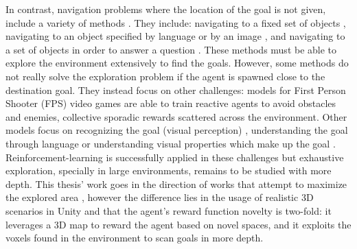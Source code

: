 In contrast, navigation problems where the location of the goal is not given, include a variety of methods \cite{chaplot2020semantic}. They include: navigating to a
fixed set of objects \cite{chaplot2017arnold, dosovitskiy2016learning, gupta2017cognitive, lample2017playing, mirowski2016learning, wu2016training}, navigating to an object specified by language \cite{chaplot2018gated, hermann2017grounded} or by 
an image \cite{chaplot2020neural, zhu2017target}, and navigating to a set of objects in order to answer a question 
\cite{das2018embodied, gordon2018iqa}.
These methods must be able to explore the environment extensively to find the goals. However, some methods do not really solve the exploration problem if the agent is spawned close to the destination goal. They instead focus on other challenges: models for First Person Shooter (FPS) video games  \cite{chaplot2017arnold, dosovitskiy2016learning, lample2017playing,  wu2016training} are able to train reactive agents to avoid obstacles and enemies, collective sporadic rewards scattered across the environment. Other models focus on recognizing the goal (visual perception) \cite{chaplot2020neural, zhu2017target}, understanding the goal through language \cite{chaplot2018gated, hermann2017grounded} or understanding visual properties which make up the goal \cite{das2018embodied, gordon2018iqa}. Reinforcement-learning is successfully applied in these challenges but exhaustive exploration, specially in large environments, remains to be studied with more depth. 
This thesis' work goes in the direction of works that attempt to maximize the explored area \cite{chaplot2020learning, chen2019learning, fang2019scene}, however the difference lies in the usage of realistic 3D scenarios in Unity and that the agent's reward function novelty is two-fold: it leverages a 3D map to reward the agent based on novel spaces, and it exploits the voxels found in the environment to scan goals in more depth.





